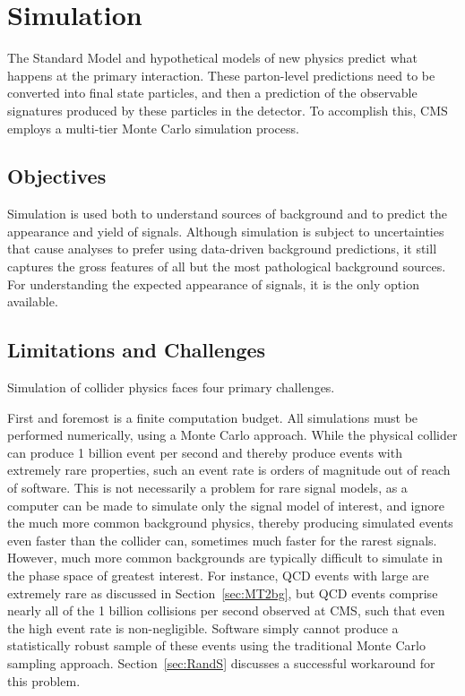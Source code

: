 \section{Simulation} \label{sec:simulation}

  The Standard Model and hypothetical models of new physics predict what happens at the primary interaction.
  These parton-level predictions need to be converted into final state particles, and then a prediction of the observable signatures produced by these particles in the detector.
  To accomplish this, CMS employs a multi-tier Monte Carlo simulation process.

  \subsection{Objectives} \label{sec:objectives}

  Simulation is used both to understand sources of background and to predict the appearance and yield of signals.
  Although simulation is subject to uncertainties that cause analyses to prefer using data-driven background predictions, it still captures the gross features of all but the most pathological background sources.
  For understanding the expected appearance of signals, it is the only option available.

  \subsection{Limitations and Challenges} \label{sec:limitations}

  Simulation of collider physics faces four primary challenges.

  First and foremost is a finite computation budget. 
  All simulations must be performed numerically, using a Monte Carlo approach.
  While the physical collider can produce 1 billion event per second and thereby produce events with extremely rare properties, such an event rate is orders of magnitude out of reach of software.
  This is not necessarily a problem for rare signal models, as a computer can be made to simulate only the signal model of interest, and ignore the much more common background physics, thereby producing simulated events even faster than the collider can, sometimes much faster for the rarest signals.
  However, much more common backgrounds are typically difficult to simulate in the phase space of greatest interest.
  For instance, QCD events with large \mttwo are extremely rare as discussed in Section~\ref{sec:MT2bg}, but QCD events comprise nearly all of the 1 billion collisions per second observed at CMS, such that even the high \mttwo event rate is non-negligible.
  Software simply cannot produce a statistically robust sample of these events using the traditional Monte Carlo sampling approach.
  Section~\ref{sec:RandS} discusses a successful workaround for this problem.


